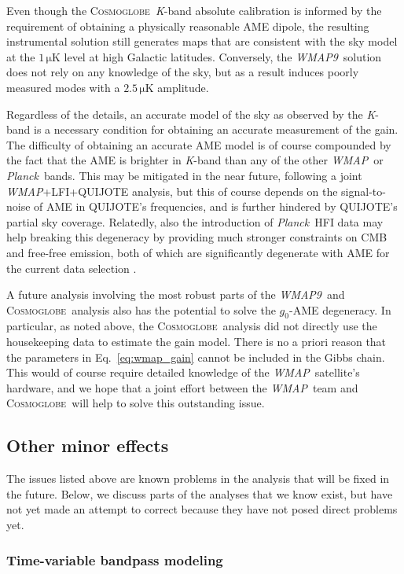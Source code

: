 \documentclass[twocolumn]{../../common/aa}
\def\WMAP{\emph{WMAP}}
\def\WMAPnine{\emph{WMAP9}}
\def\Planck{\emph{Planck}}
\newcommand{\cosmoglobe}{\textsc{Cosmoglobe}}
\newcommand{\K}[0]{\textit K}
\begin{document}
Even though the \cosmoglobe\ \K-band absolute calibration is informed by the requirement of obtaining a physically reasonable AME dipole, the resulting instrumental solution still generates maps that are consistent with the sky model at the $1\,\mathrm{\mu K}$ level at high Galactic latitudes. Conversely, the \WMAPnine\ solution does not rely on any knowledge of the sky, but as a result induces poorly measured modes with a $2.5\,\mathrm{\mu K}$ amplitude. 


Regardless of the details, an accurate model of the sky as observed by the \K-band is a necessary condition for obtaining an accurate measurement of the gain. The difficulty of obtaining an accurate AME model is of course compounded by the fact that the AME is brighter in \K-band than any of the other \WMAP\ or \Planck\ bands. This may be mitigated in the near future, following a joint \WMAP+LFI+QUIJOTE analysis, but this of course depends on the signal-to-noise of AME in QUIJOTE's frequencies, and is further hindered by QUIJOTE's partial sky coverage. Relatedly, also the introduction of \Planck\ HFI data may help breaking this degeneracy by providing much stronger constraints on CMB and free-free emission, both of which are significantly degenerate with AME for the current data selection \citep{bp13}.

A future analysis involving the most robust parts of the \WMAPnine\ and \cosmoglobe\ analysis also has the potential to solve the $g_0$-AME degeneracy. In particular, as noted above, the \cosmoglobe\ analysis did not directly use the housekeeping data to estimate the gain model. There is no a priori reason that the parameters in Eq.~\eqref{eq:wmap_gain} cannot be included in the Gibbs chain. This would of course require detailed knowledge of the \WMAP\ satellite's hardware, and we hope that a joint effort between the \WMAP\ team and \cosmoglobe\ will help to solve this outstanding issue.


\subsection{Other minor effects}
\label{sec:minor}

The issues listed above are known problems in the analysis that will be fixed in the future. Below, we discuss parts of the analyses that we know exist, but have not yet made an attempt to correct because they have not posed direct problems yet.

\subsubsection{Time-variable bandpass modeling}
\end{document}
